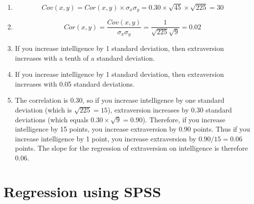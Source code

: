 \documentclass[]{book}\usepackage[]{graphicx}\usepackage[]{color}
\begin{document}
\begin{enumerate}

\item

\begin{equation}
Cov(x,y)= Cor(x,y) \times \sigma_x \sigma_y= 0.30 \times \sqrt{45}\times \sqrt{225}=30
\end{equation}



\item

\begin{equation}
Cor(x,y)= \frac{Cov(x,y)} { \sigma_x \sigma_y}= \frac{1} { \sqrt{225} \sqrt{9}}=0.02
\end{equation}

\item
If you increase intelligence by 1 standard deviation, then extraversion increases with a tenth of a standard deviation.

\item
If you increase intelligence by 1 standard deviation, then extraversion increases with 0.05 standard deviations.

\item
The correlation is 0.30, so if you increase intelligence by one standard deviation (which is $\sqrt{225}=15$), extraversion increases by 0.30 standard deviations (which equals $0.30 \times \sqrt{9}=0.90$). Therefore, if you increase intelligence by 15 points, you increase extraversion by 0.90 points. Thus if you increase intelligence by 1 point, you increase extraversion by $0.90/15=0.06$ points. The slope for the regression of extraversion on intelligence is therefore 0.06.


\end{enumerate}


\section{Regression using SPSS}
\end{document}
